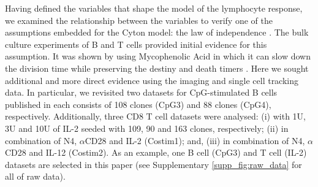 \documentclass[11pt, a4paper]{article}
\begin{document}
\linenumbers
\noindent
Having defined the variables that shape the model of the lymphocyte response, we examined the relationship between the variables to verify one of the assumptions embedded for the Cyton model: the law of independence \parencite{Gett.2000, Hodgkin.2005e0d}. The bulk culture experiments of B and T cells provided initial evidence for this assumption. It was shown by using Mycophenolic Acid in which it can slow down the division time while preserving the destiny and death timers \parencite{Heinzel.2016}. Here we sought additional and more direct evidence using the imaging and single cell tracking data. In particular, we revisited two datasets for CpG-stimulated B cells published in \cite{Hawkins.2009} each consists of 108 clones (CpG3) and 88 clones (CpG4), respectively. Additionally, three CD8 T cell datasets were analysed: (i) with 1U, 3U and 10U of IL-2 seeded with 109, 90 and 163 clones, respectively; (ii) in combination of N4, $\alpha$CD28 and IL-2 (Costim1); and, (iii) in combination of N4, $\alpha$CD28 and IL-12 (Costim2). As an example, one B cell (CpG3) and T cell (IL-2) datasets are selected in this paper (see Supplementary \cref{supp_fig:raw_data} for all of raw data).
\end{document}
